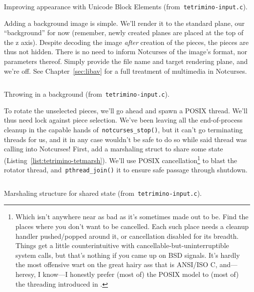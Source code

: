 \begin{listing}[!htbp]
\inputminted[]{C}{code/tetrimino-databox.h}
\begin{verbatim}

\end{verbatim}
\inputminted[]{C}{code/tetrimino-displayutf8.h}
\caption{Improving appearance with Unicode Block Elements (from~\texttt{tetrimino-input.c}).}
\label{list:tetrimino-displayutf8}
\end{listing}

Adding a background image is simple. We'll render it to the standard plane, our
``background'' for now (remember, newly created planes are placed at the top of
the z axis). Despite decoding the image \textit{after} creation of the pieces,
the pieces are thus not hidden. There is no need to inform Notcurses of the
image's format, nor parameters thereof. Simply provide the file name and target
rendering plane, and we're off. See Chapter~\ref{sec:libav} for a full treatment
of multimedia in Notcurses.

\begin{listing}[!htbp]
\inputminted[]{C}{code/tetrimino-background.h}
\caption{Throwing in a background (from~\texttt{tetrimino-input.c}).}
\label{list:tetrimino-background}
\end{listing}

To rotate the unselected pieces, we'll go ahead and spawn a POSIX thread. We'll
thus need lock against piece selection. We've been leaving all the end-of-process
cleanup in the capable hands of~\texttt{notcurses\_stop()}, but it can't go
terminating threads for us, and it in any case wouldn't be safe to do so while
said thread was calling into Notcurses! First, add a marshaling struct to share
some state (Listing~\ref{list:tetrimino-tetmarsh}). We'll use POSIX
cancellation\footnote{Which isn't anywhere near as bad as it's sometimes made out to be.
Find the places where you don't want to be cancelled. Each such place needs a
cleanup handler pushed/popped around it, or cancellation disabled for its
breadth. Things get a little counterintuitive with
cancellable-but-uninterruptible system calls, but that's nothing if you came up
on BSD signals. It's hardly the most offensive wart on the great hairy ass
that is ANSI/ISO C, and---heresy, I know---I honestly prefer (most of) the
POSIX model to (most of)
the threading introduced in .} to blast the rotator thread, and~\texttt{pthread\_join()}
it to ensure safe passage through shutdown.

\begin{listing}[!htbp]
\inputminted[]{C}{code/tetrimino-tetmarsh.h}
\caption{Marshaling structure for shared state (from~\texttt{tetrimino-input.c}).}
\label{list:tetrimino-tetmarsh}
\end{listing}

